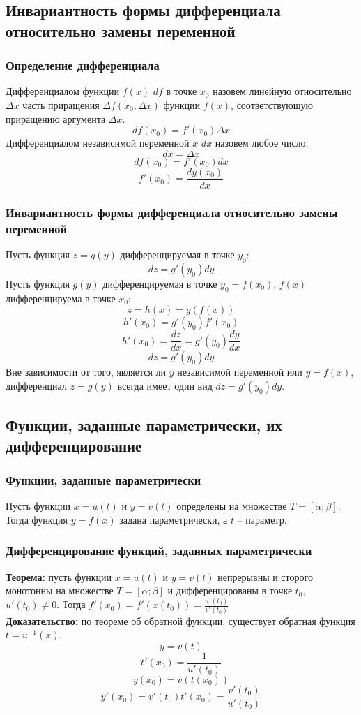 \documentclass{article}
\newcommand{\theorem}{\textbf{Теорема:} }
\newcommand{\proof}{\textbf{Доказательство:} }
\begin{document}
    \subsection*{Инвариантность формы дифференциала относительно замены переменной}
        \subsubsection*{Определение дифференциала}
        Дифференциалом функции $f(x)$ $df$ в точке $x_0$ назовем линейную относительно $\Delta x$ часть приращения $\Delta f(x_0, \Delta x)$ функции $f(x)$,
        соответствующую приращению аргумента $\Delta x$.
        \[ df (x_0) = f'(x_0) \Delta x \]
        Дифференциалом независимой переменной $x$ $dx$ назовем любое число.
        \[ dx = \Delta x \]
        \[ df (x_0) = f'(x_0) dx \]
        \[ f'(x_0) = \frac{dy(x_0)}{dx} \]
        
        \subsubsection*{Инвариантность формы дифференциала относительно замены переменной}
        Пусть функция $z = g(y)$ дифференцируемая в точке $y_0$:
        \[ dz = g'(y_0) dy \]
        Пусть функция $g(y)$ дифференцируемая в точке $y_0 = f(x_0)$, $f(x)$ дифференцируема в точке $x_0$:
        \[ z = h(x) = g(f(x)) \]
        \[ h'(x_0) = g'(y_0) f'(x_0) \]
        \[ h'(x_0) = \frac{dz}{dx} = g'(y_0) \frac{dy}{dx} \]
        \[ dz = g'(y_0) dy \]
        Вне зависимости от того, является ли $y$ независимой переменной или $y = f(x)$, дифференциал $z = g(y)$ всегда имеет один вид $dz = g'(y_0)dy$.


    \subsection*{Функции, заданные параметрически, их дифференцирование}
        \subsubsection*{Функции, заданные параметрически}
        Пусть функции $x = u(t)$ и $y = v(t)$ определены на множестве $T = [\alpha; \beta]$. Тогда функция $y = f(x)$ задана параметрически, а $t$ -- параметр.

        \subsubsection*{Дифференцирование функций, заданных параметрически}
        \theorem пусть функции $x = u(t)$ и $y = v(t)$ непрерывны и сторого монотонны на множестве $T = [\alpha; \beta]$ и дифференцированы в точке $t_0$, $u'(t_0) \neq 0$.
        Тогда $f'(x_0) = f'(x(t_0)) = \frac{u'(t_0)}{v'(t_0)}$
        \\
        \proof по теореме об обратной функции, существует обратная функция $t = u^{-1}(x)$.
        \[ y = v(t) \]
        \[ t'(x_0) = \frac{1}{u'(t_0)} \]
        \[ y(x_0) = v(t(x_0)) \]
        \[ y'(x_0) = v'(t_0) t'(x_0) = \frac{v'(t_0)}{u'(t_0)} \]
\end{document}
